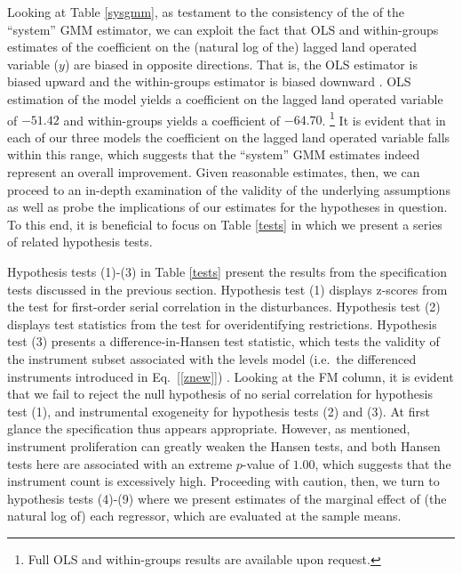 \documentclass[english]{article}
\begin{document}
 Looking at Table \ref{sysgmm}, as testament to the consistency of the
 of the ``system'' GMM estimator, we can exploit the fact that OLS and 
 within-groups estimates of the coefficient on the (natural log of the) lagged 
 land operated variable ($y$) are biased in opposite directions. 
 That is, the OLS estimator is biased upward and the within-groups estimator
 is biased downward \citep{bond2002}.
 OLS estimation of the model yields a coefficient on the lagged land operated 
 variable of $-51.42$ and within-groups yields a coefficient of $-64.70$.%
 \footnote{Full OLS and within-groups results are available upon request.}
 It is evident that in each of our three models the coefficient on the lagged
 land operated variable falls within this range, which suggests that the 
 ``system'' GMM estimates indeed represent an overall improvement.
 Given reasonable estimates, then, we can proceed to an in-depth 
 examination of the validity of the underlying assumptions as well as probe
 the implications of our estimates for the hypotheses in question.
 To this end, it is beneficial to focus on Table \ref{tests} in which we 
 present a series of related hypothesis tests.
 
Hypothesis tests (1)-(3) in Table \ref{tests} present the results from the 
specification tests discussed in the previous section. 
Hypothesis test (1) displays z-scores from the \citet{arellano1991} test 
for first-order serial correlation in the disturbances.
Hypothesis test (2) displays test statistics from the \citet{hansen1982} 
test for overidentifying restrictions.
Hypothesis test (3) presents a difference-in-Hansen test statistic, which 
tests the validity of the instrument subset associated with the levels model
(i.e.\ the differenced instruments introduced in Eq.\ [\ref{znew}]) .
Looking at the FM column, it is evident that we fail to reject the null 
hypothesis of no serial correlation for hypothesis test (1), and instrumental
exogeneity for hypothesis tests (2) and (3).
At first glance the specification thus appears appropriate.
However, as mentioned, instrument proliferation can greatly weaken the 
Hansen tests, and both Hansen tests here are associated with an extreme 
$p$-value of $1.00$, which suggests that the instrument count is excessively 
high. 
Proceeding with caution, then, we turn to hypothesis tests (4)-(9) where we 
present estimates of the marginal effect of (the natural log of) each regressor, 
which are evaluated at the sample means.
\end{document}
